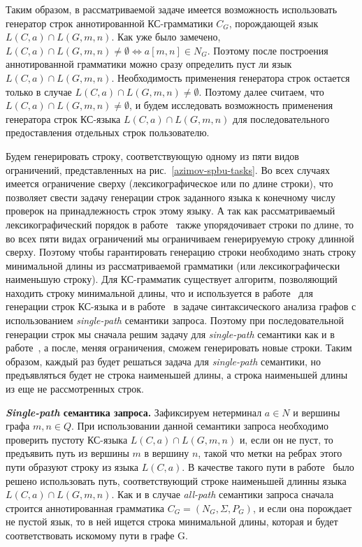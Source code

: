 Таким образом, в рассматриваемой задаче имеется возможность использовать генератор строк аннотированной КС-грамматики $C_{G}$, порождающей язык $L(C,a) \cap L(G,m,n)$. Как уже было замечено, $L(C,a) \cap L(G,m,n) \ne \emptyset \Leftrightarrow a[m,n] \in N_{G}$. Поэтому после построения аннотированной грамматики можно сразу определить пуст ли язык $L(C,a) \cap L(G,m,n)$. Необходимость применения генератора строк остается только в случае $L(C,a) \cap L(G,m,n) \ne \emptyset$. Поэтому далее считаем, что $L(C,a) \cap L(G,m,n) \ne \emptyset$, и будем исследовать возможность применения генератора строк КС-языка $L(C,a) \cap L(G,m,n)$ для последовательного предоставления отдельных строк пользователю.

Будем генерировать строку, соответствующую одному из пяти видов ограничений, представленных на рис.~\ref{azimov-spbu-tasks}. Во всех случаях имеется ограничение сверху (лексикографическое или по длине строки), что позволяет свести задачу генерации строк заданного языка к конечному числу проверок на принадлежность строк этому языку. А так как рассматриваемый лексикографический порядок в работе~\cite{azimov-spbu-Okhotin} также упорядочивает строки по длине, то во всех пяти видах ограничений мы ограничиваем генерируемую строку длинной сверху. Поэтому чтобы гарантировать генерацию строки необходимо знать строку минимальной длины из рассматриваемой грамматики (или лексикографически наименьшую строку). Для КС-грамматик существует алгоритм, позволяющий находить строку минимальной длины, что и используется в работе~\cite{azimov-spbu-Okhotin} для генерации строк КС-языка и в работе~\cite{azimov-spbu-hellings2} в задаче синтаксического анализа графов с использованием \textit{single-path} семантики запроса. Поэтому при последовательной генерации строк мы сначала решим задачу для \textit{single-path} семантики как и в работе~\cite{azimov-spbu-hellings2}, а после, меняя ограничения, сможем генерировать новые строки. Таким образом, каждый раз будет решаться задача для \textit{single-path} семантики, но предъявляться будет не строка наименьшей длины, а строка наименьшей длины из еще не рассмотренных строк.

\textbf{\textit{Single-path} семантика запроса.} Зафиксируем нетерминал $a \in N$ и вершины графа $m, n \in Q$. При использовании данной семантики запроса необходимо проверить пустоту КС-языка $L(C,a) \cap L(G,m,n)$ и, если он не пуст, то предъявить путь из вершины $m$ в вершину $n$, такой что метки на ребрах этого пути образуют строку из языка $L(C,a)$. В качестве такого пути в работе~\cite{azimov-spbu-hellings2} было решено использовать путь, соответствующий строке наименьшей длинны языка $L(C,a) \cap L(G,m,n)$. Как и в случае \textit{all-path} семантики запроса сначала строится аннотированная грамматика $C_{G} = (N_{G}, \Sigma, P_{G})$, и если она порождает не пустой язык, то в ней ищется строка минимальной длины, которая и будет соответствовать искомому пути в графе G.

